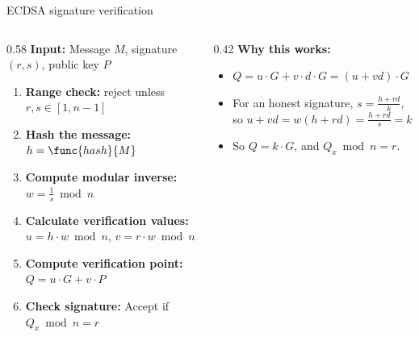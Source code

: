 \ifdefined\PRESENTATION\else\PassOptionsToClass{handout}{beamer}\fi\documentclass[aspectratio=169, lualatex]{beamer}
\begin{document}
\begin{frame}{ECDSA signature verification}
	\begin{columns}
		\begin{column}{0.58\textwidth}
			\textbf{Input:} Message $M$, signature $(r, s)$, public key $P$
			\begin{enumerate}
				\item \textbf{Range check:} reject unless $r, s \in [1, n-1]$
				\item \textbf{Hash the message:} $h = \func{hash}{M}$
				\item \textbf{Compute modular inverse:} $w = \frac{1}{s} \bmod n$
				\item \textbf{Calculate verification values:} $u = h \cdot w \bmod n$, \quad $v = r \cdot w \bmod n$
				\item \textbf{Compute verification point:} $Q = u \cdot G + v \cdot P$
				\item \textbf{Check signature:} Accept if $Q_x \bmod n = r$
			\end{enumerate}
		\end{column}
		\begin{column}{0.42\textwidth}
			\textbf{Why this works:}
			\begin{itemize}
				\item $Q = u \cdot G + v \cdot d \cdot G = (u + vd) \cdot G$
				\item For an honest signature, $s = \frac{h + rd}{k}$, so $u + vd = w (h + rd) = \frac{h + rd}{s} = k$
				\item So $Q = k \cdot G$, and $Q_x \bmod n = r$.
			\end{itemize}
		\end{column}
	\end{columns}
\end{frame}
\end{document}
